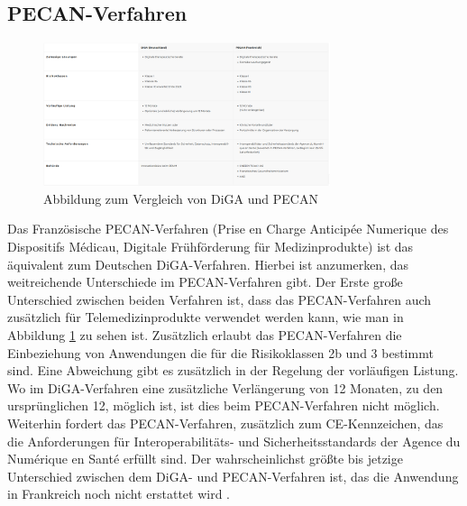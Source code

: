 \documentclass{article}
\begin{document}
		\subsection{PECAN-Verfahren}
			\begin{figure}[htbp]
				\centering
				\includegraphics[width=0.75\textwidth]{./grafiken/abbildung-diga-versus-pecan}
				\caption[DiGA vs. PECAN]{Abbildung zum Vergleich von DiGA und PECAN}
				\label{Abb-diga-vs-pecan}
			\end{figure}
			Das Französische PECAN-Verfahren (Prise en Charge Anticipée Numerique des Dispositifs Médicau, Digitale Frühförderung für Medizinprodukte) ist das äquivalent zum Deutschen DiGA-Verfahren. Hierbei ist anzumerken, das weitreichende Unterschiede im PECAN-Verfahren gibt. Der Erste große Unterschied zwischen beiden Verfahren ist, dass das PECAN-Verfahren auch zusätzlich für Telemedizinprodukte verwendet werden kann, wie man in Abbildung \ref{Abb-diga-vs-pecan} zu sehen ist. Zusätzlich erlaubt das PECAN-Verfahren die Einbeziehung von Anwendungen die für die Risikoklassen 2b und 3 bestimmt sind. Eine Abweichung gibt es zusätzlich in der Regelung der vorläufigen Listung. Wo im DiGA-Verfahren eine zusätzliche Verlängerung von 12 Monaten, zu den ursprünglichen 12, möglich ist, ist dies beim PECAN-Verfahren nicht möglich. Weiterhin fordert das PECAN-Verfahren, zusätzlich zum CE-Kennzeichen, das die Anforderungen für Interoperabilitäts- und Sicherheitsstandards der Agence du Numérique en Santé erfüllt sind. Der wahrscheinlichst größte bis jetzige Unterschied zwischen dem DiGA- und PECAN-Verfahren ist, das die Anwendung in Frankreich noch nicht erstattet wird \cite{PECAN-Verfahren}.
\end{document}
